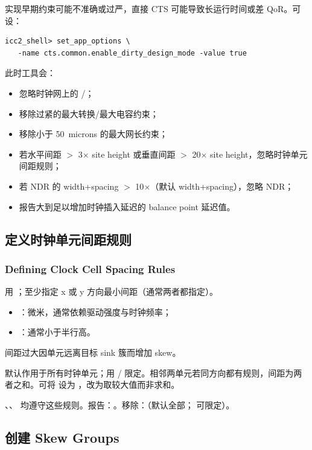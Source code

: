 实现早期约束可能不准确或过严，直接 CTS 可能导致长运行时间或差 QoR。可设：
\begin{lstlisting}
icc2_shell> set_app_options \
   -name cts.common.enable_dirty_design_mode -value true
\end{lstlisting}
此时工具会：
\begin{itemize}
  \item 忽略时钟网上的 /；
  \item 移除过紧的最大转换/最大电容约束；
  \item 移除小于 50~microns 的最大网长约束；
  \item 若水平间距 $>$ 3$\times$ site height 或垂直间距 $>$ 20$\times$ site height，忽略时钟单元间距规则；
  \item 若 NDR 的 width+spacing $>$ 10$\times$（默认 width+spacing），忽略 NDR；
  \item 报告大到足以增加时钟插入延迟的 balance point 延迟值。
\end{itemize}

\subsection{定义时钟单元间距规则}
\subsubsection*{Defining Clock Cell Spacing Rules}

用 ；至少指定 x 或 y 方向最小间距（通常两者都指定）。
\begin{itemize}
  \item {}：微米，通常依赖驱动强度与时钟频率；
  \item {}：通常小于半行高。
\end{itemize}
\begin{noteBox}
间距过大因单元远离目标 sink 簇而增加 skew。
\end{noteBox}
默认作用于所有时钟单元；用 / 限定。相邻两单元若同方向都有规则，间距为两者之和。可将  设为 ，改为取较大值而非求和。

、、 均遵守这些规则。报告：。移除：（默认全部； 可限定）。

\subsection{创建 Skew Groups}
